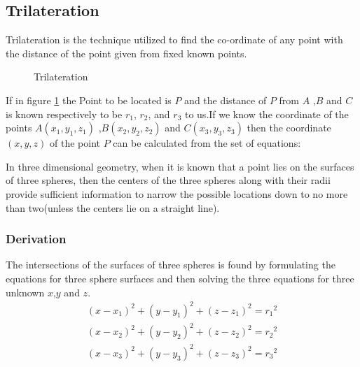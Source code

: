 \subsection{Trilateration}
Trilateration is the technique utilized to find the co-ordinate of any point with the distance of the point given from fixed known points.	

\begin{figure}[htpb]
	\centering
	\caption{Trilateration}
	\label{fig:Trilateration}
\end{figure}

If in figure \ref{fig:Trilateration} the Point to be located is $P$ and the distance of $P$ from $A$ ,$B$ and $C$ is known respectively to be $r_1$, $r_2$, and $r_3$ to us.If we know the coordinate of the points $A(x_1,y_1,z_1)$ ,$B(x_2,y_2,z_2)$ and $C(x_3,y_3,z_3)$ then the coordinate $(x,y,z)$ of the point $P$ can be calculated from the set of equations:


In three dimensional geometry, when it is known that a point lies on the surfaces of three spheres, then the centers of the three spheres along with their radii provide sufficient information to narrow the possible locations down to no more than two(unless the centers lie on a straight line).

\subsubsection{Derivation}
The intersections of the surfaces of three spheres is found by formulating the equations for three sphere surfaces and then solving the three equations for three unknown $x$,$y$ and $z$.
\begin{eqnarray}
	\label{equation1} (x-x_1)^2+(y-y_1)^2+(z-z_1)^2={r_1}^2 \\
	\label{equation2} (x-x_2)^2+(y-y_2)^2+(z-z_2)^2={r_2}^2 \\
	\label{equation3} (x-x_3)^2+(y-y_3)^2+(z-z_3)^2={r_3}^2 
\end{eqnarray}

